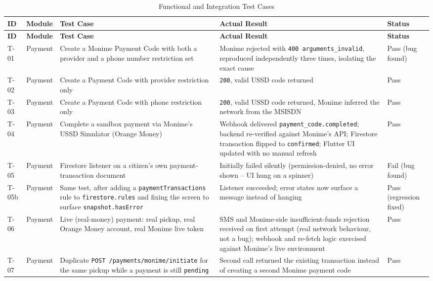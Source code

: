 \begin{longtable}{@{}p{1.1cm}p{2.6cm}p{4.4cm}p{4.4cm}p{1.4cm}@{}}
\caption{Functional and Integration Test Cases} \label{tab:test-cases} \\
\toprule \textbf{ID} & \textbf{Module} & \textbf{Test Case} & \textbf{Actual Result} & \textbf{Status} \\ \midrule
\endfirsthead
\toprule \textbf{ID} & \textbf{Module} & \textbf{Test Case} & \textbf{Actual Result} & \textbf{Status} \\ \midrule
\endhead
T-01 & Payment & Create a Monime Payment Code with both a provider and a phone number restriction set & Monime rejected with \texttt{400 arguments\_invalid}, reproduced independently three times, isolating the exact cause & Pass (bug found) \\
T-02 & Payment & Create a Payment Code with provider restriction only & \texttt{200}, valid USSD code returned & Pass \\
T-03 & Payment & Create a Payment Code with phone restriction only & \texttt{200}, valid USSD code returned, Monime inferred the network from the MSISDN & Pass \\
T-04 & Payment & Complete a sandbox payment via Monime's USSD Simulator (Orange Money) & Webhook delivered \texttt{payment\_code.completed}; backend re-verified against Monime's API; Firestore transaction flipped to \texttt{confirmed}; Flutter UI updated with no manual refresh & Pass \\
T-05 & Payment & Firestore listener on a citizen's own payment-transaction document & Initially failed silently (permission-denied, no error shown -- UI hung on a spinner) & Fail (bug found) \\
T-05b & Payment & Same test, after adding a \texttt{paymentTransactions} rule to \texttt{firestore.rules} and fixing the screen to surface \texttt{snapshot.hasError} & Listener succeeded; error states now surface a message instead of hanging & Pass (regression fixed) \\
T-06 & Payment & Live (real-money) payment: real pickup, real Orange Money account, real Monime live token & SMS and Monime-side insufficient-funds rejection received on first attempt (real network behaviour, not a bug); webhook and re-fetch logic exercised against Monime's live environment & Pass \\
T-07 & Payment & Duplicate \texttt{POST~/payments/monime/initiate} for the same pickup while a payment is still \texttt{pending} & Second call returned the existing transaction instead of creating a second Monime payment code & Pass \\

\end{longtable}
